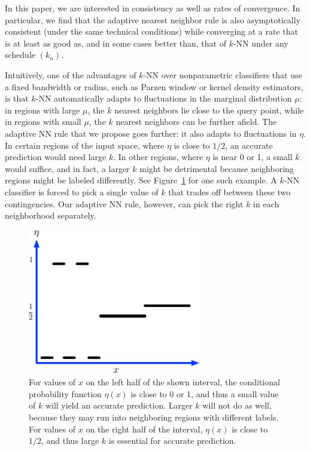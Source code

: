 \documentclass{article}
\begin{document}
In this paper, we are interested in consistency as well as rates of convergence. In particular, we find that the adaptive nearest neighbor rule is also asymptotically consistent (under the same technical conditions) while converging at a rate that is at least as good as, and in some cases better than, that of $k$-NN under any schedule $(k_n)$.

Intuitively, one of the advantages of $k$-NN over nonparametric classifiers that use a fixed bandwidth or radius, such as Parzen window or kernel density estimators, is that $k$-NN automatically adapts to fluctuations in the marginal distribution $\mu$: in regions with large $\mu$, the $k$ nearest neighbors lie close to the query point, while in regions with small $\mu$, the $k$ nearest neighbors can be further afield. The adaptive NN rule that we propose goes further: it also adapts to fluctuations in $\eta$. In certain regions of the input space, where $\eta$ is close to $1/2$, an accurate prediction would need large $k$. In other regions, where $\eta$ is near 0 or 1, a small $k$ would suffice, and in fact, a larger $k$ might be detrimental because neighboring regions might be labeled differently. See Figure~\ref{fig:rationale} for one such example. A $k$-NN classifier is forced to pick a single value of $k$ that trades off between these two contingencies. Our adaptive NN rule, however, can pick the right $k$ in each neighborhood separately.

\begin{figure}
\begin{center}
\includegraphics[width=3in]{adaptive-rationale.pdf}
\end{center}
\caption{For values of $x$ on the left half of the shown interval, the conditional probability function $\eta(x)$ is close to 0 or 1, and thus a small value of $k$ will yield an accurate prediction. Larger $k$ will not do as well, because they may run into neighboring regions with different labels. For values of $x$ on the right half of the interval, $\eta(x)$ is close to $1/2$, and thus large $k$ is essential for accurate prediction.}
\label{fig:rationale}
\end{figure}
\end{document}
